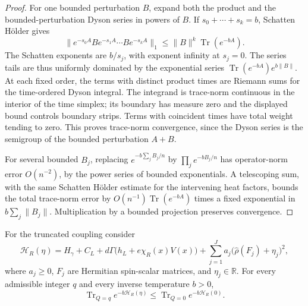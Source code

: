 \begin{proof}
For one bounded perturbation \(B\), expand both the product and the
bounded-perturbation Dyson series in powers of \(B\). If
\(s_0+\cdots+s_k=b\), Schatten H\"older gives
\[
\|e^{-s_0A}B e^{-s_1A}\cdots B e^{-s_kA}\|_1
\le\|B\|^k\operatorname{Tr}(e^{-bA}).
\]
The Schatten exponents are \(b/s_j\), with exponent infinity at
\(s_j=0\). The series tails are thus uniformly dominated by the
exponential series \(\operatorname{Tr}(e^{-bA})e^{b\|B\|}\).
At each fixed order, the terms with distinct product times are Riemann
sums for the time-ordered Dyson integral. The integrand is trace-norm
continuous in the interior of the time simplex; its boundary has
measure zero and the displayed bound controls boundary strips. Terms
with coincident times have total weight tending to zero. This proves
trace-norm convergence, since the Dyson series is the semigroup of the
bounded perturbation \(A+B\).

For several bounded \(B_j\), replacing
\(e^{-b\sum_jB_j/n}\) by \(\prod_je^{-bB_j/n}\) has operator-norm
error \(O(n^{-2})\), by the power series of bounded exponentials.
A telescoping sum, with the same Schatten H\"older estimate for the
intervening heat factors, bounds the total trace-norm error by
\(O(n^{-1})\operatorname{Tr}(e^{-bA})\) times a fixed exponential
in \(b\sum_j\|B_j\|\). Multiplication by a bounded projection
preserves convergence.
\end{proof}

\begin{proposition}
\label{pe-truncated-domination}
For the truncated coupling consider
\[
\mathcal H_R(\eta)=H_\gamma+C_L+
d\Gamma\bigl(h_L+e\chi_R(x)V(x)\bigr)
+\sum_{j=1}^J a_j\bigl(\widehat\rho(F_j)+\eta_j\bigr)^2,
\]
where \(a_j\ge0\), \(F_j\) are Hermitian spin-scalar matrices, and
\(\eta_j\in\mathbb R\). For every admissible integer \(q\) and
every inverse temperature \(b>0\),
\begin{equation}
\operatorname{Tr}_{Q=q}e^{-b\mathcal H_R(\eta)}
\le\operatorname{Tr}_{Q=0}e^{-b\mathcal H_R(0)}.
\label{pe-thermal-domination}
\end{equation}
\end{proposition}

